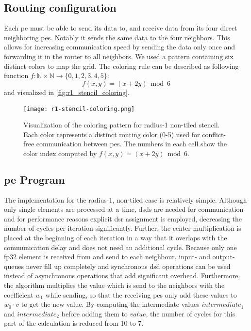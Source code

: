 \subsection{Routing configuration}
Each \ac{pe} must be able to send its data to, and receive data from its four direct neighboring \acp{pe}. Notably it sends the same data to the four neighbors. This allows for increasing communication speed by sending the data only once and forwarding it in the router to all neighbors. We used a pattern containing six distinct colors to map the grid.
The coloring rule can be described as following function $f:\mathbb{N}\times\mathbb{N}\to\{0,1,2,3,4,5\}$:
\begin{equation}
    \label{eq:coloring_function}
    f(x,y) = (x + 2y) \bmod 6
\end{equation}
and visualized in \autoref{fig:r1_stencil_coloring}.
\begin{figure}
    \centering
    \texttt{[image: r1-stencil-coloring.png]}
    \caption{Visualization of the coloring pattern for radius-1 non-tiled stencil. Each color represents a distinct routing color (0-5) used for conflict-free communication between \acp{pe}. The numbers in each cell show the color index computed by $f(x,y) = (x + 2y) \bmod 6$.}
    \label{fig:r1_stencil_coloring}
\end{figure}

\subsection{\ac{pe} Program}
The implementation for the radius-1, non-tiled case is relatively simple.
Although only single elements are processed at a time, \acp{dsd} are needed for communication and for performance reasons explicit \ac{dsr} assignment is employed, decreasing the number of cycles per iteration significantly.  
Further, the center multiplication is placed at the beginning of each iteration in a way that it overlaps with the communication delay and does not need an additional cycle.
Because only one fp32 element is received from and send to each neighbour, input- and output- queues never fill up completely and synchronous \ac{dsd} operations can be used instead of asynchronous operations that add significant overhead.
Furthermore, the algorithm multiplies the value which is send to the neighbors with the coefficient $w_1$ while sending, so that the receiving \acp{pe} only add these values to $w_0 \cdot v$ to get the new value.
By computing the intermediate values $intermediate_1$ and $intermediate_2$ before adding them to $value$, the number of cycles for this part of the calculation is reduced from 10 to 7.

